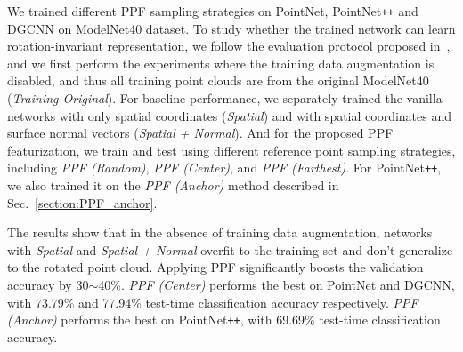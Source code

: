 \documentclass{article}
\begin{document}
We trained different PPF sampling strategies on PointNet, PointNet\texttt{++} and DGCNN on ModelNet40 dataset. 
To study whether the trained network can learn rotation-invariant representation, we follow the evaluation protocol proposed in~\cite{taghanaki2020robustpointset}, and we first perform the experiments where the training data augmentation is disabled, and thus all training point clouds are from the original ModelNet40 (\textit{Training Original}). 
For baseline performance, we separately trained the vanilla networks with only spatial coordinates (\textit{Spatial}) and with spatial coordinates and surface normal vectors (\textit{Spatial + Normal}).
And for the proposed PPF featurization, we train and test using different reference point sampling strategies, including \textit{PPF (Random)}, \textit{PPF (Center)}, and \textit{PPF (Farthest)}. 
For PointNet\texttt{++}, we also trained it on the \textit{PPF (Anchor)} method described in Sec.~\ref{section:PPF_anchor}. 

The results show that in the absence of training data augmentation, networks with \textit{Spatial} and \textit{Spatial + Normal} overfit to the training set and don’t generalize to the rotated point cloud. 
Applying PPF significantly boosts the validation accuracy by 30$\sim$40\%. \textit{PPF (Center)} performs the best on PointNet and DGCNN, with 73.79\% and 77.94\% test-time classification accuracy respectively. \textit{PPF (Anchor)} performs the best on PointNet\texttt{++}, with 69.69\% test-time classification accuracy.
\end{document}
